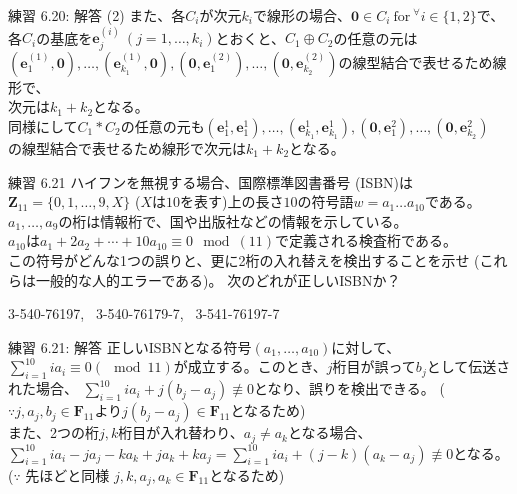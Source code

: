\documentclass[dvipdfmx,10pt,jsarticle]{beamer}
\begin{document}
  \begin{frame}{練習 6.20: 解答 (2)}
    また、各$C_i$が次元$k_i$で線形の場合、$\mathbf{0} \in C_i \ \text{for} \ {}^\forall i \in \lbrace 1, 2 \rbrace$で、\\
    各$C_i$の基底を$\mathbf{e}_j^{(i)} \ (j = 1 , \ldots, k_i)$とおくと、$C_1 \oplus C_2$の任意の元は \\
    $(\mathbf{e}_1^{(1)},\mathbf{0}) , \ldots, (\mathbf{e}_{k_1}^{(1)}, \mathbf{0}), (\mathbf{0}, \mathbf{e}_1^{(2)}), \ldots, (\mathbf{0}, \mathbf{e}_{k_2}^{(2)})$の線型結合で表せるため線形で、 \\
    次元は$k_1 + k_2$となる。\\
    同様にして$C_1 \ast C_2$の任意の元も$(\mathbf{e}_1^1,\mathbf{e}_1^1) , \ldots, (\mathbf{e}_{k_1}^1, \mathbf{e}_{k_1}^1), (\mathbf{0}, \mathbf{e}_1^2), \ldots, (\mathbf{0}, \mathbf{e}_{k_2}^2)$ \\
    の線型結合で表せるため線形で次元は$k_1 + k_2$となる。
    
  \end{frame}

  \begin{frame}{練習 6.21}
    ハイフンを無視する場合、国際標準図書番号 (ISBN)は$\mathbf{Z}_{11} = \lbrace 0, 1, \ldots, 9, X\rbrace$ ($X$は$10$を表す)上の長さ$10$の符号語$w = a_1 \ldots a_{10}$である。\\
    $a_1, \ldots, a_9$の桁は情報桁で、国や出版社などの情報を示している。 \\ $a_{10}$は$a_1 + 2a_2 + \cdots + 10 a_{10} \equiv 0 \mod (11)$で定義される検査桁である。 \\
    この符号がどんな1つの誤りと、更に2桁の入れ替えを検出することを示せ (これらは一般的な人的エラーである)。 次のどれが正しいISBNか？ \\
    \begin{center}
        3-540-76197, \ 3-540-76179-7, \ 3-541-76197-7 
    \end{center}
  \end{frame}
  
  \begin{frame}{練習 6.21: 解答}
    正しいISBNとなる符号$(a_1, \ldots, a_{10})$に対して、$\sum_{i=1}^{10} i a_i \equiv 0 (\mod 11)$が成立する。このとき、$j$桁目が誤って$b_j$として伝送された場合、
    $\sum_{i=1}^{10} i a_i + j(b_j - a_j) \not\equiv 0$となり、誤りを検出できる。 ($\because j, a_j, b_j \in \mathbf{F}_{11}$より$j(b_j - a_j) \in \mathbf{F}_{11}$となるため) \\
    また、2つの桁$j,k$桁目が入れ替わり、$a_j \neq a_k$となる場合、$\sum_{i=1}^{10} i a_i - j a_j - k a_k + j a_k + k a_j = \sum_{i=1}^{10} ia_i + (j - k) (a_k - a_j) \not\equiv 0$となる。\\
    ($\because$ 先ほどと同様 $j, k , a_j, a_k \in \mathbf{F}_{11}$となるため)
    
  \end{frame}
\end{document}
